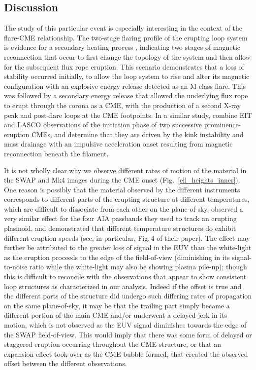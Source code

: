 \documentclass[namedreferences]{solarphysics}
\begin{document}
\begin{article}
\section{Discussion}
\label{sect:discussion}

The study of this particular event is especially interesting in the context of the flare-CME relationship. The two-stage flaring profile of the erupting loop system is evidence for a secondary heating process \cite{2012ApJ...746L...5S}, indicating two stages of magnetic reconnection that occur to first change the topology of the system and then allow for the subsequent flux rope eruption. This scenario demonstrates that a loss of stability occurred initially, to allow the loop system to rise and alter its magnetic configuration with an explosive energy release detected as an M-class flare. This was followed by a secondary energy release that allowed the underlying flux rope to erupt through the corona as a CME, with the production of a second X-ray peak and post-flare loops at the CME footpoints. In a similar study,  combine EIT and LASCO observations of the initiation phase of two successive prominence-eruption CMEs, and determine that they are driven by the kink instability and mass drainage with an impulsive acceleration onset resulting from magnetic reconnection beneath the filament.




It is not wholly clear why we observe different rates of motion of the material in the SWAP and Mk4 images during the CME onset (Fig.~\ref{ell_heights_inner}). One reason is possibly that the material observed by the different instruments corresponds to different parts of the erupting structure at different temperatures, which are difficult to dissociate from each other on the plane-of-sky.  observed a very similar effect for the four AIA passbands they used to track an erupting plasmoid, and demonstrated that different temperature structures do exhibit different eruption speeds (see, in particular, Fig.\,4 of their paper). The effect may further be attributed to the greater loss of signal in the EUV than the white-light as the eruption proceeds to the edge of the field-of-view (diminishing in its signal-to-noise ratio while the white-light may also be showing plasma pile-up); though this is difficult to reconcile with the observations that appear to show consistent loop structures as characterized in our analysis. Indeed if the offset is true and the different parts of the structure did undergo such differing rates of propagation on the same plane-of-sky, it may be that the trailing part simply became a different portion of the main CME and/or underwent a delayed jerk in its motion, which is not observed as the EUV signal diminishes towards the edge of the SWAP field-of-view. This would imply that there was some form of delayed or staggered eruption occurring throughout the CME structure, or that an expansion effect took over as the CME bubble formed, that created the observed offset between the different observations. 




\end{article}
\end{document}
